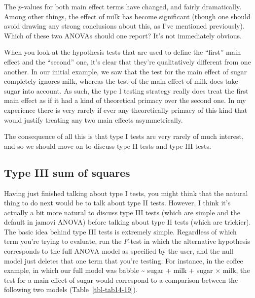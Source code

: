 \documentclass[
  a4paper,
]{book}
\begin{document}
The \(p\)-values for both main effect terms have changed, and fairly
dramatically. Among other things, the effect of milk has become
significant (though one should avoid drawing any strong conclusions
about this, as I've mentioned previously). Which of these two ANOVAs
should one report? It's not immediately obvious.

When you look at the hypothesis tests that are used to define the
``first'' main effect and the ``second'' one, it's clear that they're
qualitatively different from one another. In our initial example, we saw
that the test for the main effect of sugar completely ignores milk,
whereas the test of the main effect of milk does take sugar into
account. As such, the type I testing strategy really does treat the
first main effect as if it had a kind of theoretical primacy over the
second one. In my experience there is very rarely if ever any
theoretically primacy of this kind that would justify treating any two
main effects asymmetrically.

The consequence of all this is that type I tests are very rarely of much
interest, and so we should move on to discuss type II tests and type III
tests.

\hypertarget{type-iii-sum-of-squares}{%
\subsection{Type III sum of squares}\label{type-iii-sum-of-squares}}

Having just finished talking about type I tests, you might think that
the natural thing to do next would be to talk about type II tests.
However, I think it's actually a bit more natural to discuss type III
tests (which are simple and the default in jamovi ANOVA) before talking
about type II tests (which are trickier). The basic idea behind type III
tests is extremely simple. Regardless of which term you're trying to
evaluate, run the \(F\)-test in which the alternative hypothesis
corresponds to the full ANOVA model as specified by the user, and the
null model just deletes that one term that you're testing. For instance,
in the coffee example, in which our full model was babble
\textasciitilde{} sugar + milk + sugar \(\times\) milk, the test for a
main effect of sugar would correspond to a comparison between the
following two models (Table~\ref{tbl-tab14-19}).

\hypertarget{tbl-tab14-19}{}
 
  \providecommand{\huxb}[2]{\arrayrulecolor[RGB]{#1}\global\arrayrulewidth=#2pt}
  \providecommand{\huxvb}[2]{\color[RGB]{#1}\vrule width #2pt}
  \providecommand{\huxtpad}[1]{\rule{0pt}{#1}}
  \providecommand{\huxbpad}[1]{\rule[-#1]{0pt}{#1}}
\end{document}
